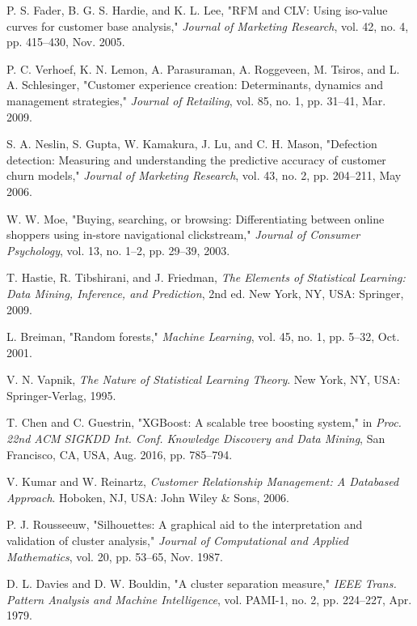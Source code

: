 \documentclass[12pt,a4paper]{report}
\begin{document}
\begin{enumerate}
P. S. Fader, B. G. S. Hardie, and K. L. Lee, "RFM and CLV: Using iso-value curves for customer base analysis," \textit{Journal of Marketing Research}, vol. 42, no. 4, pp. 415--430, Nov. 2005.

P. C. Verhoef, K. N. Lemon, A. Parasuraman, A. Roggeveen, M. Tsiros, and L. A. Schlesinger, "Customer experience creation: Determinants, dynamics and management strategies," \textit{Journal of Retailing}, vol. 85, no. 1, pp. 31--41, Mar. 2009.

S. A. Neslin, S. Gupta, W. Kamakura, J. Lu, and C. H. Mason, "Defection detection: Measuring and understanding the predictive accuracy of customer churn models," \textit{Journal of Marketing Research}, vol. 43, no. 2, pp. 204--211, May 2006.

W. W. Moe, "Buying, searching, or browsing: Differentiating between online shoppers using in-store navigational clickstream," \textit{Journal of Consumer Psychology}, vol. 13, no. 1--2, pp. 29--39, 2003.

T. Hastie, R. Tibshirani, and J. Friedman, \textit{The Elements of Statistical Learning: Data Mining, Inference, and Prediction}, 2nd ed. New York, NY, USA: Springer, 2009.

L. Breiman, "Random forests," \textit{Machine Learning}, vol. 45, no. 1, pp. 5--32, Oct. 2001.

V. N. Vapnik, \textit{The Nature of Statistical Learning Theory}. New York, NY, USA: Springer-Verlag, 1995.

T. Chen and C. Guestrin, "XGBoost: A scalable tree boosting system," in \textit{Proc. 22nd ACM SIGKDD Int. Conf. Knowledge Discovery and Data Mining}, San Francisco, CA, USA, Aug. 2016, pp. 785--794.

V. Kumar and W. Reinartz, \textit{Customer Relationship Management: A Databased Approach}. Hoboken, NJ, USA: John Wiley \& Sons, 2006.

P. J. Rousseeuw, "Silhouettes: A graphical aid to the interpretation and validation of cluster analysis," \textit{Journal of Computational and Applied Mathematics}, vol. 20, pp. 53--65, Nov. 1987.

D. L. Davies and D. W. Bouldin, "A cluster separation measure," \textit{IEEE Trans. Pattern Analysis and Machine Intelligence}, vol. PAMI-1, no. 2, pp. 224--227, Apr. 1979.


\end{enumerate}
\end{document}
